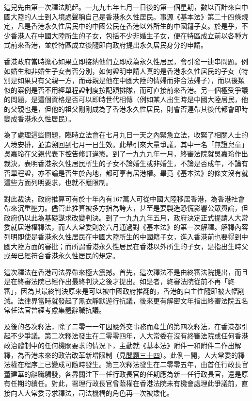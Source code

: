 這兒先由第一次釋法說起。一九九七年七月一日後的第一個星期，數以百計來自中國大陸的人士到入境處聲稱自己是香港永久性居民。事源《基本法》第二十四條規定，凡是香港永久性居民中的中國公民在香港以外所生的中國籍子女。於是乎，不少香港人在中國大陸所生的子女，包括不少非婚生子女，便在特區成立前以各種方式前來香港，並於特區成立後隨即向政府提出永久居民身分的申請。

香港政府當時擔心如果立即接納他們立即成為永久性居民，會引發一連串問題。例如婚生和非婚生子女有否分別，如何證明申請人真的是香港永久性居民的子女（特別是如果只有父親一方，而母親是他在中國大陸的情婦而非合法婦子），而以後類似的案例是否不用經單程證制度按配額排隊，而可直接前來香港。另一個極受爭議的問題，是這個資格是否可以即時世代相傳（例如某人出生時是中國大陸居民，他的父親也是，但他的祖父剛剛成為了香港永久性居民，則會否連帶其後代都會即時變成香港永久性居民）。

為了處理這些問題，臨時立法會在七月九日一天之內緊急立法，收緊了相關人士的入境安排，並追溯回到七月一日生效。此舉引來大量爭議，其中一名「無證兒童」吳嘉玲在父親代表下控告修訂違憲。到了一九九九年一月，終審法院就吳嘉玲作出裁決，表明香港永久性居民所生的子女不論婚生或非婚生，不論是否成年，不論有否單程證，亦不論是否生於內地，都可享有居港權。畢竟《基本法》的條文沒有就這些方面列明要求，也就不應限制。

對此裁決，政府推算可有於十年內有167萬人可從中國大陸移居香港，為香港社會帶來沉重壓力。儘管此推算被多方指為誇大，甚至是要製造恐慌影響公眾輿論，但政府仍以此為基礎謀求改變判決。到了一九九九年五月，政府決定正式提請人大常委就居港權釋法，而人大常委則於六月通過對《基本法》的第一次解釋。解釋內容列明即使是香港永久性居民在中國大陸所生的中國籍子女，進入香港前也要得到中國大陸方面的審批；而所謂香港永久性居民在香港以外所生的子女，是指出生時父或母已經符合香港永久性居民的規定。

這次釋法在香港司法界帶來極大震撼。首先，這次釋法不是由終審法院提出，而且是在終審法院已經作出最終判決之後才提出。如是者，終審法院從前不再「終審」，因為其最終判決原來是可以被中國政府推翻的，香港的自主性隨即被大幅削減。法律界當時就發起了黑衣靜默遊行抗議，後來更有解密文年指出終審法院五名常任法官曾經考慮集體辭職抗議。

及後的各次釋法，除了二零一一年因應外交事務而產生的第四次釋法，在香港都引起不少爭議。第二次釋法發生在二零零四年，人大常委在沒有終審法院或任何香港政治體制中的任何機關要求的情況下，主動就《基本法》附件一和附件二作出解釋，為香港未來的政治改革新增限制（見\hyperref[sec:sec34]{問題三十四}）。此例一開，人大常委的釋法權在程序上已變成可隨時發生。第三次釋法發生在二零零五年，由首任行政長官董建華的辭職觸發，各界關注下一任行政長官的任期應為新一任行政長官，還是原有任期的續任。對此，署理行政長官曾蔭權在香港法院未有機會處理此爭議前，直接向人大常委尋求釋法，司法機構的角色再一次被矮化。

